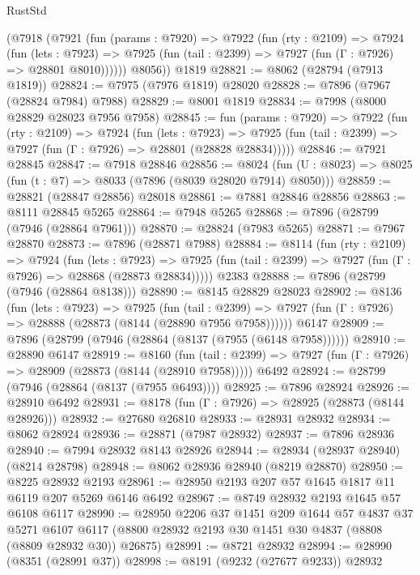 \begin{lexlean}{RustStd}
\begin{coremodule}
      (@7918
        (@7921
          (fun (params : @7920) =>
          @7922
            (fun (rty : @2109) =>
            @7924
              (fun (lets : @7923) =>
              @7925 (fun (tail : @2399) => @7927 (fun (Γ : @7926) => @28801 @8010))))))
        @8056))
    @1819
@28821 := @8062 (@28794 (@7913 @1819))
@28824 := @7975 (@7976 @1819) @28020
@28828 := @7896 (@7967 (@28824 @7984) @7988)
@28829 := @8001 @1819
@28834 := @7998 (@8000 @28829 @28023 @7956 @7958)
@28845 := fun (params : @7920) =>
  @7922
    (fun (rty : @2109) =>
    @7924
      (fun (lets : @7923) =>
      @7925 (fun (tail : @2399) => @7927 (fun (Γ : @7926) => @28801 (@28828 @28834)))))
@28846 := @7921 @28845
@28847 := @7918 @28846
@28856 := @8024
    (fun (U : @8023) => @8025 (fun (t : @7) => @8033 (@7896 (@8039 @28020 @7914) @8050)))
@28859 := @28821 (@28847 @28856) @28018
@28861 := @7881 @28846 @28856
@28863 := @8111 @28845 @5265
@28864 := @7948 @5265
@28868 := @7896 (@28799 (@7946 (@28864 @7961)))
@28870 := @28824 (@7983 @5265)
@28871 := @7967 @28870
@28873 := @7896 (@28871 @7988)
@28884 := @8114
    (fun (rty : @2109) =>
    @7924
      (fun (lets : @7923) =>
      @7925 (fun (tail : @2399) => @7927 (fun (Γ : @7926) => @28868 (@28873 @28834)))))
    @2383
@28888 := @7896 (@28799 (@7946 (@28864 @8138)))
@28890 := @8145 @28829 @28023
@28902 := @8136
    (fun (lets : @7923) =>
    @7925
      (fun (tail : @2399) =>
      @7927 (fun (Γ : @7926) => @28888 (@28873 (@8144 (@28890 @7956 @7958))))))
    @6147
@28909 := @7896 (@28799 (@7946 (@28864 (@8137 (@7955 (@6148 @7958))))))
@28910 := @28890 @6147
@28919 := @8160
    (fun (tail : @2399) => @7927 (fun (Γ : @7926) => @28909 (@28873 (@8144 (@28910 @7958)))))
    @6492
@28924 := @28799 (@7946 (@28864 (@8137 (@7955 @6493))))
@28925 := @7896 @28924
@28926 := @28910 @6492
@28931 := @8178 (fun (Γ : @7926) => @28925 (@28873 (@8144 @28926)))
@28932 := @27680 @26810
@28933 := @28931 @28932
@28934 := @8062 @28924
@28936 := @28871 (@7987 @28932)
@28937 := @7896 @28936
@28940 := @7994 @28932 @8143 @28926
@28944 := @28934 (@28937 @28940) (@8214 @28798)
@28948 := @8062 @28936 @28940 (@8219 @28870)
@28950 := @8225 @28932 @2193
@28961 := @28950 @2193 @207 @57 @1645 @1817 @11 @6119 @207 @5269 @6146 @6492
@28967 := @8749 @28932 @2193 @1645 @57 @6108 @6117
@28990 := @28950
    @2206
    @37
    @1451
    @209
    @1644
    @57
    @4837
    @37
    @5271
    @6107
    @6117
    (@8800 @28932 @2193 @30 @1451 @30 @4837 (@8808 (@8809 @28932 @30)) @26875)
@28991 := @8721 @28932
@28994 := @28990 (@8351 (@28991 @37))
@28998 := @8191 (@9232 (@27677 @9233)) @28932

\end{coremodule}
\end{lexlean}

